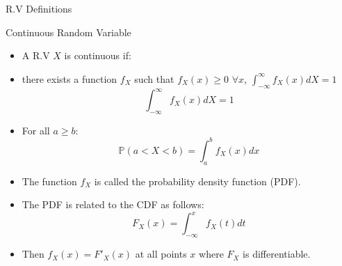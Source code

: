 \documentclass[handout]{beamer}
\begin{document}
\begin{frame}{R.V Definitions}
\scriptsize{
\begin{block}{Continuous Random Variable}
\begin{itemize}
 \item A R.V $X$ is continuous if:
 \item there exists a function  $f_{X}$ such that $f_{X}(x) \geq 0$ $\forall x$,  $\int_{-\infty}^{\infty}f_{X}(x)dX=1$
 \begin{displaymath}
      \int_{-\infty}^{\infty}f_{X}(x)dX=1
       \end{displaymath}
\item For all $a \geq b$:
\begin{displaymath}
 \mathbb{P}(a < X < b) = \int_{a}^{b} f_{X}(x)dx
\end{displaymath}
\end{itemize}

\end{block}

\begin{itemize}
 \item The function $f_{X}$ is called the probability density function (PDF). 
 \item The PDF is related to the CDF as follows:
 \begin{displaymath}
 F_{X}(x)=\int_{-\infty}^{x}f_{X}(t)dt 
 \end{displaymath}
\item Then $f_{X}(x) = F'_X(x)$ at all points $x$ where $F_{X}$ is differentiable.
\end{itemize}

}
\end{frame}
\end{document}
